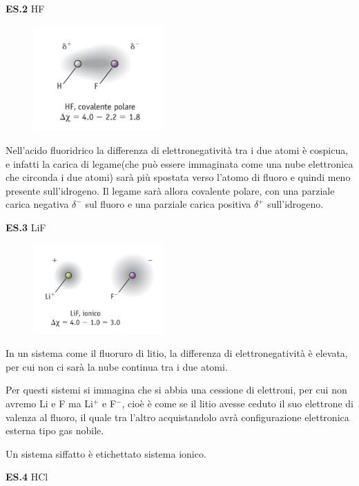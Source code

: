 \vspace{0.2cm}\textbf{ES.2} HF

\begin{figure}[htp]
    \centering
    \includegraphics[width=5cm]{immagini/HF.png}
\end{figure}
Nell'acido fluoridrico la differenza di elettronegatività tra i due atomi è cospicua, e infatti la carica di legame(che può essere immaginata come una nube elettronica che circonda i due atomi) sarà più spostata verso l'atomo di fluoro e quindi meno presente sull'idrogeno. Il legame sarà allora covalente polare, con una parziale carica negativa $\delta^-$ sul fluoro e una parziale carica positiva $\delta^+$ sull'idrogeno. 

\vspace{0.2cm}\textbf{ES.3} LiF

\begin{figure}[htp]
    \centering
    \includegraphics[width=5cm]{immagini/LiF.png}
\end{figure}

\vspace{-0.4cm}In un sistema come il fluoruro di litio, la differenza di elettronegatività è elevata, per cui non ci sarà la nube continua tra i due atomi.

Per questi sistemi si immagina che si abbia una cessione di elettroni, per cui non avremo Li e F ma Li$^+$ e F$^-$, cioè è come se il litio avesse ceduto il suo elettrone di valenza al fluoro, il quale tra l'altro acquistandolo avrà configurazione elettronica esterna tipo gas nobile.

Un sistema siffatto è etichettato sistema ionico.

\vspace{0.2cm}\textbf{ES.4} HCl

